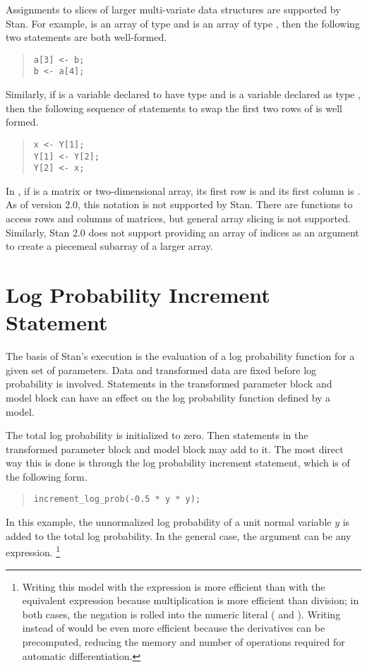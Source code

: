 Assignments to slices of larger multi-variate data structures are
supported by Stan.  For example,  is an array of type
 and  is an array of type , then
the following two statements are both well-formed.
%
\begin{quote}
\begin{Verbatim}
a[3] <- b;
b <- a[4];
\end{Verbatim}
\end{quote}
%
Similarly, if  is a variable declared to have type
 and  is a variable declared as type
, then the following sequence of statements to swap the
first two rows of  is well formed.
%
\begin{quote}
\begin{Verbatim}
x <- Y[1];
Y[1] <- Y[2];
Y[2] <- x;
\end{Verbatim}
\end{quote}
%

In \R, if  is a matrix or two-dimensional array, its first row
is  and its first column is .  As of version
2.0, this notation is not supported by Stan.  There are functions to
access rows and columns of matrices, but general array slicing is not
supported.  Similarly, Stan 2.0 does not support providing an array of
indices as an argument to create a piecemeal subarray of a larger
array.

\section{Log Probability Increment Statement}\label{increment-log-prob.section}

The basis of Stan's execution is the evaluation of a log probability
function for a given set of parameters.  Data and transformed data are
fixed before log probability is involved.  Statements in the
transformed parameter block and model block can have an effect on the
log probability function defined by a model.

The total log probability is initialized to zero.  Then statements in
the transformed parameter block and model block may add to it.  The
most direct way this is done is through the log probability increment
statement, which is of the following form.
%
\begin{quote}
\begin{Verbatim}
increment_log_prob(-0.5 * y * y);
\end{Verbatim}
\end{quote}
%
In this example, the unnormalized log probability of a unit normal
variable $y$ is added to the total log probability.  In the general
case, the argument can be any expression.%
%
\footnote{Writing this model with the expression 
  is more efficient than with the equivalent expression  because multiplication is more efficient than division; in
  both cases, the negation is rolled into the numeric literal
  ( and ).  Writing  instead of
   would be even more efficient because the derivatives
  can be precomputed, reducing the memory and number of operations
  required for automatic differentiation.}

